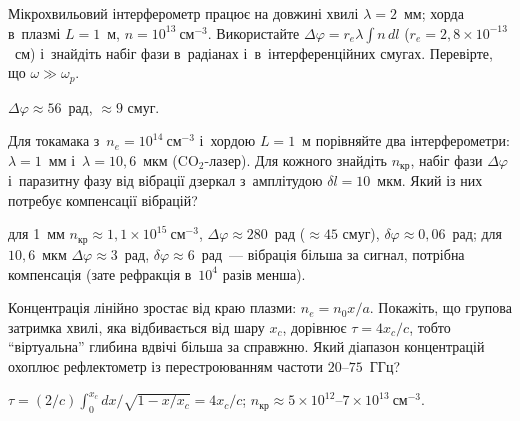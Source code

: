 \begin{problem}\label{prb:Interferometer}
	Мікрохвильовий інтерферометр працює на довжині хвилі $\lambda=2$~мм; хорда в~плазмі $L=1$~м,
	$n=10^{13}~\text{см}^{-3}$. Використайте $\Delta\varphi=r_e\lambda\int n\,dl$
	($r_e=2{,}8\times10^{-13}$~см) і~знайдіть набіг фази в~радіанах і~в~інтерференційних смугах.
	Перевірте, що $\omega\gg\omega_p$.
	\begin{solution}
		$\Delta\varphi\approx56$~рад, $\approx9$ смуг.
	\end{solution}
\end{problem}

\begin{problem}\label{prb:InterferometerWavelength}
	Для токамака з~$n_e=10^{14}~\text{см}^{-3}$ і~хордою $L=1$~м порівняйте два інтерферометри:
	$\lambda=1$~мм і~$\lambda=10{,}6$~мкм (CO$_2$-лазер). Для кожного знайдіть $n_{\mathrm{кр}}$, набіг фази
	$\Delta\varphi$ і~паразитну фазу від вібрації дзеркал з~амплітудою $\delta l=10$~мкм. Який із них
	потребує компенсації вібрацій?
	\begin{solution}
		для 1~мм $n_{\mathrm{кр}}\approx1{,}1\times10^{15}~\text{см}^{-3}$,
	$\Delta\varphi\approx280$~рад ($\approx45$ смуг), $\delta\varphi\approx0{,}06$~рад; для $10{,}6$~мкм
	$\Delta\varphi\approx3$~рад, $\delta\varphi\approx6$~рад~--- вібрація більша за сигнал, потрібна компенсація
	(зате рефракція в~$10^4$ разів менша).
	\end{solution}
\end{problem}

\begin{problem}\label{prb:ReflectometerLinear}
	Концентрація лінійно зростає від краю плазми: $n_e=n_0x/a$. Покажіть, що групова затримка хвилі, яка
	відбивається від шару $x_c$, дорівнює $\tau=4x_c/c$, тобто \enquote{віртуальна} глибина вдвічі більша
	за справжню. Який діапазон концентрацій охоплює рефлектометр із перестроюванням частоти $20$--$75$~ГГц?
	\begin{solution}
		$\tau=(2/c)\int_0^{x_c}dx/\sqrt{1-x/x_c}=4x_c/c$;
	$n_{\mathrm{кр}}\approx5\times10^{12}$--$7\times10^{13}~\text{см}^{-3}$.
	\end{solution}
\end{problem}


